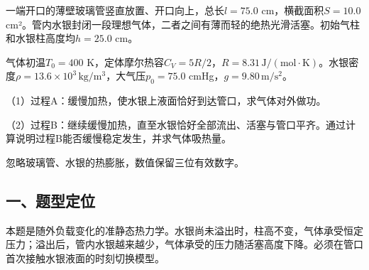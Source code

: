 \documentclass[12pt,a4paper,fontset=fandol]{ctexart}
\begin{document}
一端开口的薄壁玻璃管竖直放置、开口向上，总长\(l=75.0\)
cm，横截面积\(S=10.0\)
cm²。管内水银封闭一段理想气体，二者之间有薄而轻的绝热光滑活塞。初始气柱和水银柱高度均\(h=25.0\)
cm。

气体初温\(T_0=400\)
K，定体摩尔热容\(C_V=5R/2\)，\(R=8.31\,\mathrm{J/(mol\cdot K)}\)。水银密度\(\rho=13.6\times10^3\,\mathrm{kg/m^3}\)，大气压\(p_0=75.0\)
cmHg，\(g=9.80\,\mathrm{m/s^2}\)。

\begin{center}
\begin{minipage}{\linewidth}
\centering\begingroup{}
\ifdim\wd\diagrambox>.88\linewidth
\sbox{\diagrambox}{\resizebox{.88\linewidth}{!}{\usebox{\diagrambox}}}\fi
\ifdim\ht\diagrambox>.38\textheight
\resizebox{!}{.38\textheight}{\usebox{\diagrambox}}
\else\usebox{\diagrambox}\fi
\par{}\endgroup\end{minipage}\end{center}

（1）过程A：缓慢加热，使水银上液面恰好到达管口，求气体对外做功。

（2）过程B：继续缓慢加热，直至水银恰好全部流出、活塞与管口平齐。通过计算说明过程B能否缓慢稳定发生，并求气体吸热量。

忽略玻璃管、水银的热膨胀，数值保留三位有效数字。

\subsection{一、题型定位}\label{ux4e00ux9898ux578bux5b9aux4f4d-1}

本题是随外负载变化的准静态热力学。水银尚未溢出时，柱高不变，气体承受恒定压力；溢出后，管内水银越来越少，气体承受的压力随活塞高度下降。必须在管口首次接触水银液面的时刻切换模型。
\end{document}
